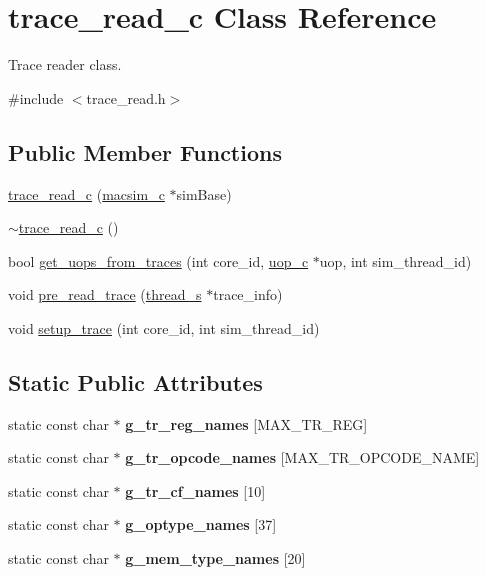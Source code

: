 \hypertarget{classtrace__read__c}{
\section{trace\_\-read\_\-c Class Reference}
\label{classtrace__read__c}
}


Trace reader class.  




{\ttfamily \#include $<$trace\_\-read.h$>$}

\subsection*{Public Member Functions}
\begin{DoxyCompactItemize}
\item 
\hyperlink{classtrace__read__c_af1e97f217786742f927a8cfb19e75b4e}{trace\_\-read\_\-c} (\hyperlink{classmacsim__c}{macsim\_\-c} $\ast$simBase)
\item 
\hyperlink{classtrace__read__c_a6e68015f7b152374329a8228215213e6}{$\sim$trace\_\-read\_\-c} ()
\item 
bool \hyperlink{classtrace__read__c_a262fb0303f53144c30c267dc3e454c6c}{get\_\-uops\_\-from\_\-traces} (int core\_\-id, \hyperlink{classuop__c}{uop\_\-c} $\ast$uop, int sim\_\-thread\_\-id)
\item 
void \hyperlink{classtrace__read__c_a4552577d58bbc847977cdba517a58c10}{pre\_\-read\_\-trace} (\hyperlink{structthread__s}{thread\_\-s} $\ast$trace\_\-info)
\item 
void \hyperlink{classtrace__read__c_ad4b1b2fec74a627bb1d39d40d3a68b80}{setup\_\-trace} (int core\_\-id, int sim\_\-thread\_\-id)
\end{DoxyCompactItemize}
\subsection*{Static Public Attributes}
\begin{DoxyCompactItemize}
\item 
\hypertarget{classtrace__read__c_a10174761af18a3353195cd71f66aa6f5}{
static const char $\ast$ {\bfseries g\_\-tr\_\-reg\_\-names} \mbox{[}MAX\_\-TR\_\-REG\mbox{]}}
\label{classtrace__read__c_a10174761af18a3353195cd71f66aa6f5}

\item 
\hypertarget{classtrace__read__c_af27cab2059c89a18a7e0a22f52d74779}{
static const char $\ast$ {\bfseries g\_\-tr\_\-opcode\_\-names} \mbox{[}MAX\_\-TR\_\-OPCODE\_\-NAME\mbox{]}}
\label{classtrace__read__c_af27cab2059c89a18a7e0a22f52d74779}

\item 
static const char $\ast$ {\bfseries g\_\-tr\_\-cf\_\-names} \mbox{[}10\mbox{]}
\item 
static const char $\ast$ {\bfseries g\_\-optype\_\-names} \mbox{[}37\mbox{]}
\item 
static const char $\ast$ {\bfseries g\_\-mem\_\-type\_\-names} \mbox{[}20\mbox{]}
\end{DoxyCompactItemize}
